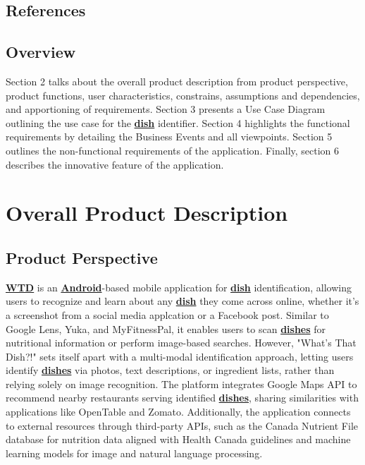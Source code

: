 \documentclass[]{article}
\begin{document}

\subsection{References}
\label{sub:references}

\renewcommand{\refname}{}  %
\vspace{-7mm}  %


\subsection{Overview}
\label{sub:overview}

Section 2 talks about the overall product description from product perspective, product functions, user characteristics, constrains, assumptions and dependencies, and apportioning of requirements.
Section 3 presents a Use Case Diagram outlining the use case for the \hyperref[Dish]{\textbf{dish}} identifier.
Section 4 highlights the functional requirements by detailing the Business Events and all viewpoints.
Section 5 outlines the non-functional requirements of the application.
Finally, section 6 describes the innovative feature of the application.


\section{Overall Product Description}
\label{sec:overall_description}

\subsection{Product Perspective}
\label{sub:product_perspective}

\hyperref[WTD]{\textbf{WTD}} is an \hyperref[Android]{\textbf{Android}}-based mobile application for \hyperref[Dish]{\textbf{dish}} identification, allowing users to recognize and learn about any \hyperref[Dish]{\textbf{dish}} they come across online, whether it's a screenshot from a social media applcation or a Facebook post. Similar to Google Lens, Yuka, and MyFitnessPal, it enables users to scan \hyperref[Dish]{\textbf{dishes}} for nutritional information or perform image-based searches. However, "What’s That Dish?!" sets itself apart with a multi-modal identification approach, letting users identify \hyperref[Dish]{\textbf{dishes}} via photos, text descriptions, or ingredient lists, rather than relying solely on image recognition. The platform integrates Google Maps API to recommend nearby restaurants serving identified \hyperref[Dish]{\textbf{dishes}}, sharing similarities with applications like OpenTable and Zomato. Additionally, the application connects to external resources through third-party APIs, such as the Canada Nutrient File database for nutrition data aligned with Health Canada guidelines and machine learning models for image and natural language processing.
\end{document}

